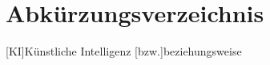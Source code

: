 
\chapter*{Abkürzungsverzeichnis}
%	
\begin{doublespace}
    
\begin{acronym}[YTMMM]
\setlength{\itemsep}{-\parsep}

[KI]{Künstliche Intelligenz}
[bzw.]{beziehungsweise}

\end{acronym}
    
\end{doublespace}